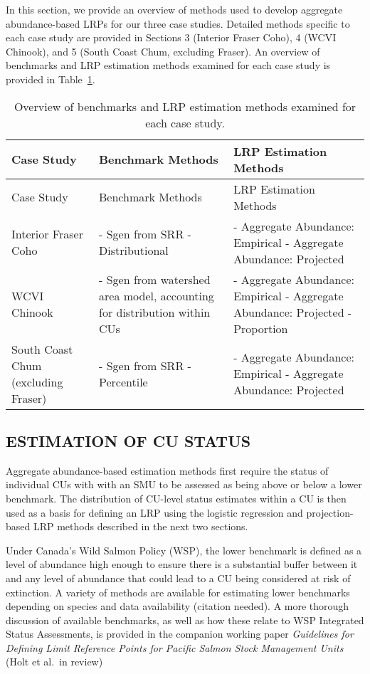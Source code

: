 \documentclass[11pt]{book}
\begin{document}
In this section, we provide an overview of methods used to develop aggregate abundance-based LRPs for our three case studies. Detailed methods specific to each case study are provided in Sections 3 (Interior Fraser Coho), 4 (WCVI Chinook), and 5 (South Coast Chum, excluding Fraser). An overview of benchmarks and LRP estimation methods examined for each case study is provided in Table~\ref{tab:csOverview}.
\begin{longtable}[]{@{}
  >{\raggedright\arraybackslash}p{}
  >{\raggedright\arraybackslash}p{}
  >{\raggedright\arraybackslash}p{}@{}}
\caption{\label{tab:csOverview} Overview of benchmarks and LRP estimation methods examined for each case study.}\tabularnewline
\toprule
Case Study & Benchmark Methods & LRP Estimation Methods \\
\midrule
\endfirsthead
\toprule
Case Study & Benchmark Methods & LRP Estimation Methods \\
\midrule
\endhead
Interior Fraser Coho & - Sgen from SRR - Distributional & - Aggregate Abundance: Empirical - Aggregate Abundance: Projected \\
WCVI Chinook & - Sgen from watershed area model, accounting for distribution within CUs & - Aggregate Abundance: Empirical - Aggregate Abundance: Projected - Proportion \\
South Coast Chum (excluding Fraser) & - Sgen from SRR - Percentile & - Aggregate Abundance: Empirical - Aggregate Abundance: Projected \\
\bottomrule
\end{longtable}
\hypertarget{estimation-of-cu-status}{%
\subsection{ESTIMATION OF CU STATUS}\label{estimation-of-cu-status}}

Aggregate abundance-based estimation methods first require the status of individual CUs with with an SMU to be assessed as being above or below a lower benchmark. The distribution of CU-level status estimates within a CU is then used as a basis for defining an LRP using the logistic regression and projection-based LRP methods described in the next two sections.

Under Canada's Wild Salmon Policy (WSP), the lower benchmark is defined as a level of abundance high enough to ensure there is a substantial buffer between it and any level of abundance that could lead to a CU being considered at risk of extinction. A variety of methods are available for estimating lower benchmarks depending on species and data availability (citation needed). A more thorough discussion of available benchmarks, as well as how these relate to WSP Integrated Status Assessments, is provided in the companion working paper \emph{Guidelines for Defining Limit Reference Points for Pacific Salmon Stock Management Units} (Holt et al.~in review)
\end{document}
